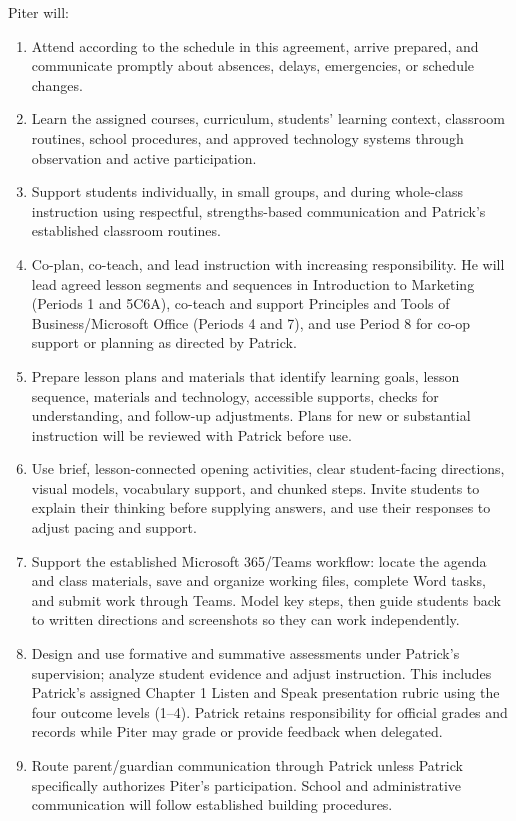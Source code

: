\documentclass[10pt]{article}
\begin{document}
Piter will:
\begin{enumerate}
  \item Attend according to the schedule in this agreement, arrive prepared, and communicate promptly about absences, delays, emergencies, or schedule changes.
  \item Learn the assigned courses, curriculum, students' learning context, classroom routines, school procedures, and approved technology systems through observation and active participation.
  \item Support students individually, in small groups, and during whole-class instruction using respectful, strengths-based communication and Patrick's established classroom routines.
  \item Co-plan, co-teach, and lead instruction with increasing responsibility. He will lead agreed lesson segments and sequences in Introduction to Marketing (Periods 1 and 5C6A), co-teach and support Principles and Tools of Business/Microsoft Office (Periods 4 and 7), and use Period 8 for co-op support or planning as directed by Patrick.
  \item Prepare lesson plans and materials that identify learning goals, lesson sequence, materials and technology, accessible supports, checks for understanding, and follow-up adjustments. Plans for new or substantial instruction will be reviewed with Patrick before use.
  \item Use brief, lesson-connected opening activities, clear student-facing directions, visual models, vocabulary support, and chunked steps. Invite students to explain their thinking before supplying answers, and use their responses to adjust pacing and support.
  \item Support the established Microsoft 365/Teams workflow: locate the agenda and class materials, save and organize working files, complete Word tasks, and submit work through Teams. Model key steps, then guide students back to written directions and screenshots so they can work independently.
  \pagebreak
  \item Design and use formative and summative assessments under Patrick's supervision; analyze student evidence and adjust instruction. This includes Patrick's assigned Chapter 1 Listen and Speak presentation rubric using the four outcome levels (1--4). Patrick retains responsibility for official grades and records while Piter may grade or provide feedback when delegated.
  \item Route parent/guardian communication through Patrick unless Patrick specifically authorizes Piter's participation. School and administrative communication will follow established building procedures.

\end{enumerate}
\end{document}
